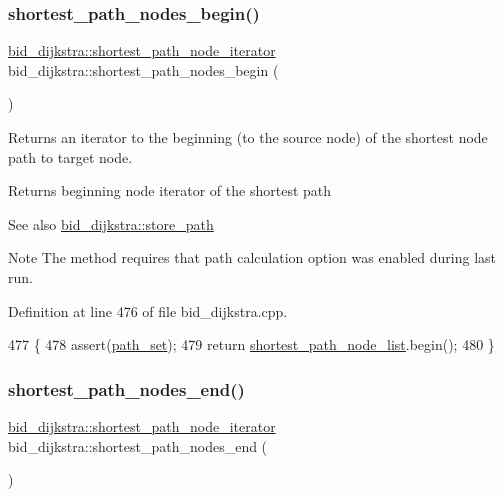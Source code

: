 \subsubsection{\texorpdfstring{shortest\+\_\+path\+\_\+nodes\+\_\+begin()}{shortest\_path\_nodes\_begin()}}
{\footnotesize\ttfamily \mbox{\hyperlink{classbid__dijkstra_a47d15051149b03179778a1553635b9d3}{bid\+\_\+dijkstra\+::shortest\+\_\+path\+\_\+node\+\_\+iterator}} bid\+\_\+dijkstra\+::shortest\+\_\+path\+\_\+nodes\+\_\+begin (\begin{DoxyParamCaption}{ }\end{DoxyParamCaption})}



Returns an iterator to the beginning (to the source node) of the shortest node path to target node. 

\begin{DoxyReturn}{Returns}
beginning node iterator of the shortest path
\end{DoxyReturn}
\begin{DoxySeeAlso}{See also}
\mbox{\hyperlink{classbid__dijkstra_a0032d9b44c8b3f6f5733ff3ef94cf169}{bid\+\_\+dijkstra\+::store\+\_\+path}}
\end{DoxySeeAlso}
\begin{DoxyNote}{Note}
The method requires that path calculation option was enabled during last run. 
\end{DoxyNote}


Definition at line 476 of file bid\+\_\+dijkstra.\+cpp.


\begin{DoxyCode}
477 \{
478     assert(\mbox{\hyperlink{classbid__dijkstra_aa7b329f69600fffae2753f87501dab9d}{path\_set}});
479     \textcolor{keywordflow}{return} \mbox{\hyperlink{classbid__dijkstra_a70041b0a90fb840e141126fe7a6119db}{shortest\_path\_node\_list}}.begin();
480 \}
\end{DoxyCode}
\mbox{\label{classbid__dijkstra_af06035d39e06a70a1c44f1c60c347c5a}} 
\subsubsection{\texorpdfstring{shortest\+\_\+path\+\_\+nodes\+\_\+end()}{shortest\_path\_nodes\_end()}}
{\footnotesize\ttfamily \mbox{\hyperlink{classbid__dijkstra_a47d15051149b03179778a1553635b9d3}{bid\+\_\+dijkstra\+::shortest\+\_\+path\+\_\+node\+\_\+iterator}} bid\+\_\+dijkstra\+::shortest\+\_\+path\+\_\+nodes\+\_\+end (\begin{DoxyParamCaption}{ }\end{DoxyParamCaption})}



